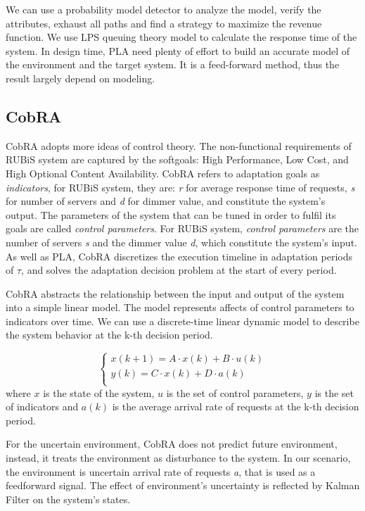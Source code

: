 \documentclass[sigconf]{acmart}
\begin{document}
We can use a probability model detector to analyze the model, verify the attributes, exhaust all paths and find a strategy to maximize the revenue function. 
We use LPS queuing theory model to calculate the response time of the system.
In design time, PLA need plenty of effort to build an accurate model of the environment and the target system. It is a feed-forward method, thus the result largely depend on modeling.

\subsection{CobRA}
CobRA adopts more ideas of control theory.
The non-functional requirements of RUBiS system are captured by the softgoals: High Performance, Low Cost, and High Optional Content Availability.
CobRA refers to adaptation goals as \textit{indicators}, for RUBiS system, they are: \textit{r} for average response time of requests, \textit{s} for number of servers and \textit{d} for dimmer value, and constitute the system's output. The parameters of the system that can be tuned in order to fulfil its goals are called \textit{control parameters}. For RUBiS system, \textit{control parameters} are the number of servers \textit{s} and the dimmer value \textit{d}, which constitute the system's input. As well as PLA, CobRA discretizes the execution timeline in adaptation periods of $\tau$, and solves the adaptation decision problem at the start of every period.

CobRA abstracts the relationship between the input and output of the system into a simple linear model. The model represents affects of control parameters to indicators over time. We can use a discrete-time linear dynamic model to describe the system behavior at the k-th decision period.

\begin{equation}
\left\{
\begin{array}{rcl}
x(k+1)=A\cdot x(k)+B\cdot u(k)\\
y(k)=C\cdot x(k)+D\cdot a(k)\\
\end{array} \right.
\end{equation}
where $x$ is the state of the system, $u$ is the set of control parameters, $y$ is the set of indicators and $a(k)$ is the average arrival rate of requests at the k-th decision period.

For the uncertain environment, CobRA does not predict future environment, instead, it treats the environment as disturbance to the system. In our scenario, the environment is uncertain arrival rate of requests \textit{a}, that is used as a feedforward signal. The effect of environment's uncertainty is reflected by Kalman Filter on the system's states.
\end{document}
